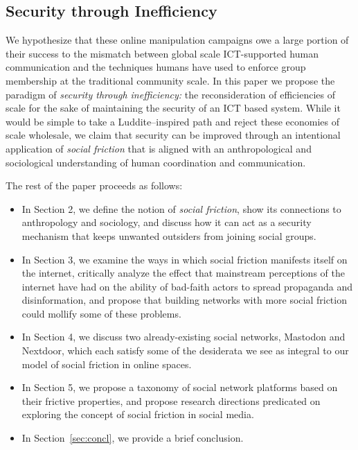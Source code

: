 \documentclass[sigconf,authordraft]{acmart}
\begin{document}
\subsection{Security through Inefficiency}

We hypothesize that these online manipulation campaigns owe a large portion of their success to the
mismatch between global scale ICT-supported human communication and the techniques humans have used
to enforce group membership at the traditional community scale. In this paper we propose the
paradigm of \emph{security through inefficiency:} the reconsideration of efficiencies of scale for
the sake of maintaining the security of an ICT based system. While it would be simple to take a
Luddite--inspired path and reject these economies of scale wholesale, we claim that security can be
improved through an intentional application of \emph{social friction} that is aligned with an
anthropological and sociological understanding of human coordination and communication.

The rest of the paper proceeds as follows:

\begin{itemize}
\item In Section 2, we define the notion of \textit{social friction}, show its connections to
anthropology and sociology, and discuss how it can act as a security mechanism that keeps unwanted
outsiders from joining social groups.
\item In Section 3, we examine the ways in which social friction manifests itself on the internet,
critically analyze the effect that mainstream perceptions of the internet have had on the ability of
bad-faith actors to spread propaganda and disinformation, and propose that building networks with
more social friction could mollify some of these problems.
\item In Section 4, we discuss two already-existing social networks, Mastodon and Nextdoor, which
each satisfy some of the desiderata we see as integral to our model of social friction in online
spaces.
\item In Section 5, we propose a taxonomy of social network platforms based on their frictive
properties, and propose research directions predicated on exploring the concept of social friction
in social media.
\item In Section~\ref{sec:concl}, we provide a brief conclusion.
\end{itemize}
\end{document}
